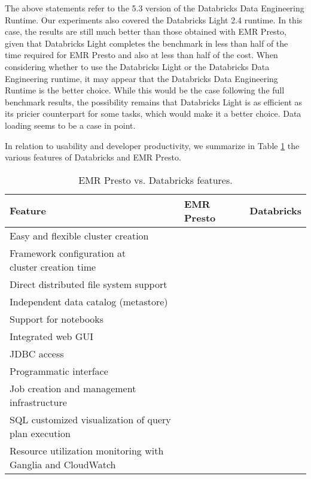 The above statements refer to the 5.3 version of the Databricks Data Engineering Runtime. Our experiments also covered the Databricks Light 2.4 runtime. In this case, the results are still much better than those obtained with EMR Presto, given that Databricks Light completes the benchmark in less than half of the time required for EMR Presto and also at less than half of the cost. When considering whether to use the Databricks Light or the Databricks Data Engineering runtime, it may appear that the Databricks Data Engineering Runtime is the better choice. While this would be the case following the full benchmark results, the possibility remains that Databricks Light is as efficient as its pricier counterpart for some tasks, which would make it a better choice. Data loading seems to be a case in point.

In relation to usability and developer productivity, we summarize in Table \ref{table:comparisonFeatures} the various features of Databricks and EMR Presto.

\begin{table}
  \centering
	\begin{tabular}{|l|l|l|}
	  \hline
		\textbf{Feature} & \textbf{EMR Presto} & \textbf{Databricks} \\ \hline
		Easy and flexible cluster creation & \cmark & \cmark \\ \hline
		\makecell[l]{Framework configuration at \\ cluster creation time} & \cmark & \cmark \\ \hline
		Direct distributed file system support & \xmark & \cmark \\ \hline
		Independent data catalog (metastore) & \cmark & \cmark \\ \hline
		Support for notebooks & \cmark & \cmark \\ \hline
		Integrated web GUI & \xmark & \cmark \\ \hline
		JDBC access & \cmark & \cmark \\ \hline
		Programmatic interface & \xmark & \cmark \\ \hline
		Job creation and management infrastructure & \xmark & \cmark \\ \hline
		\makecell[l]{SQL customized visualization of query \\ plan execution} & \cmark & \cmark \\ \hline
		\makecell[l]{Resource utilization monitoring with \\ Ganglia and CloudWatch} & \cmark & \cmark \\ \hline
	\end{tabular}
	\caption{EMR Presto vs. Databricks features.}
	\label{table:comparisonFeatures}
\end{table}

